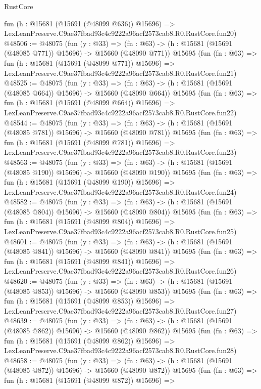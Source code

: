 \begin{lexlean}{RustCore}
\begin{coremodule}
    fun (h : @15681 (@15691 (@48099 @636)) @15696) =>
    LexLeanPreserve.C9ae37fbad93c4c9222a96acf2573cab8.R0.RustCore.fun20)
@48506 := @48075
    (fun (y : @33) =>
    (fn : @63) -> (h : @15681 (@15691 (@48085 @771)) @15696) -> @15660 (@48090 @771))
    @15695
    (fun (fn : @63) =>
    fun (h : @15681 (@15691 (@48099 @771)) @15696) =>
    LexLeanPreserve.C9ae37fbad93c4c9222a96acf2573cab8.R0.RustCore.fun21)
@48525 := @48075
    (fun (y : @33) =>
    (fn : @63) -> (h : @15681 (@15691 (@48085 @664)) @15696) -> @15660 (@48090 @664))
    @15695
    (fun (fn : @63) =>
    fun (h : @15681 (@15691 (@48099 @664)) @15696) =>
    LexLeanPreserve.C9ae37fbad93c4c9222a96acf2573cab8.R0.RustCore.fun22)
@48544 := @48075
    (fun (y : @33) =>
    (fn : @63) -> (h : @15681 (@15691 (@48085 @781)) @15696) -> @15660 (@48090 @781))
    @15695
    (fun (fn : @63) =>
    fun (h : @15681 (@15691 (@48099 @781)) @15696) =>
    LexLeanPreserve.C9ae37fbad93c4c9222a96acf2573cab8.R0.RustCore.fun23)
@48563 := @48075
    (fun (y : @33) =>
    (fn : @63) -> (h : @15681 (@15691 (@48085 @190)) @15696) -> @15660 (@48090 @190))
    @15695
    (fun (fn : @63) =>
    fun (h : @15681 (@15691 (@48099 @190)) @15696) =>
    LexLeanPreserve.C9ae37fbad93c4c9222a96acf2573cab8.R0.RustCore.fun24)
@48582 := @48075
    (fun (y : @33) =>
    (fn : @63) -> (h : @15681 (@15691 (@48085 @804)) @15696) -> @15660 (@48090 @804))
    @15695
    (fun (fn : @63) =>
    fun (h : @15681 (@15691 (@48099 @804)) @15696) =>
    LexLeanPreserve.C9ae37fbad93c4c9222a96acf2573cab8.R0.RustCore.fun25)
@48601 := @48075
    (fun (y : @33) =>
    (fn : @63) -> (h : @15681 (@15691 (@48085 @841)) @15696) -> @15660 (@48090 @841))
    @15695
    (fun (fn : @63) =>
    fun (h : @15681 (@15691 (@48099 @841)) @15696) =>
    LexLeanPreserve.C9ae37fbad93c4c9222a96acf2573cab8.R0.RustCore.fun26)
@48620 := @48075
    (fun (y : @33) =>
    (fn : @63) -> (h : @15681 (@15691 (@48085 @853)) @15696) -> @15660 (@48090 @853))
    @15695
    (fun (fn : @63) =>
    fun (h : @15681 (@15691 (@48099 @853)) @15696) =>
    LexLeanPreserve.C9ae37fbad93c4c9222a96acf2573cab8.R0.RustCore.fun27)
@48639 := @48075
    (fun (y : @33) =>
    (fn : @63) -> (h : @15681 (@15691 (@48085 @862)) @15696) -> @15660 (@48090 @862))
    @15695
    (fun (fn : @63) =>
    fun (h : @15681 (@15691 (@48099 @862)) @15696) =>
    LexLeanPreserve.C9ae37fbad93c4c9222a96acf2573cab8.R0.RustCore.fun28)
@48658 := @48075
    (fun (y : @33) =>
    (fn : @63) -> (h : @15681 (@15691 (@48085 @872)) @15696) -> @15660 (@48090 @872))
    @15695
    (fun (fn : @63) =>
    fun (h : @15681 (@15691 (@48099 @872)) @15696) =>

\end{coremodule}
\end{lexlean}
